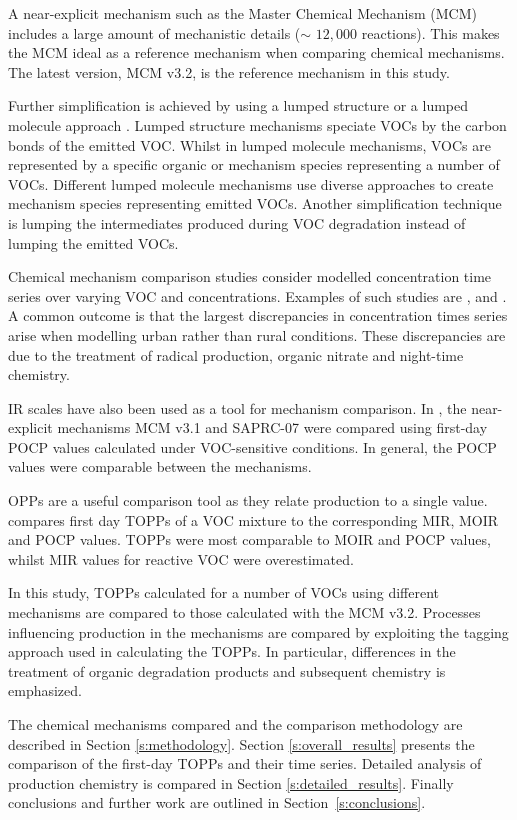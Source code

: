 A near-explicit mechanism such as the Master Chemical Mechanism (MCM) \citep{Jenkin:2003, Saunders:2003, Bloss:2005} includes a large amount of mechanistic details ($\sim$ $12,000$ reactions). 
This makes the MCM ideal as a reference mechanism when comparing chemical mechanisms. 
The latest version, MCM v3.2, \citep{MCM_Site} is the reference mechanism in this study.

Further simplification is achieved by using a lumped structure or a lumped molecule approach \citep{Dodge:2000}. 
Lumped structure mechanisms speciate VOCs by the carbon bonds of the emitted VOC. 
Whilst in lumped molecule mechanisms, VOCs are represented by a specific organic or mechanism species representing a number of VOCs. 
Different lumped molecule mechanisms use diverse approaches to create mechanism species representing emitted VOCs.  
Another simplification technique is lumping the intermediates produced during VOC degradation instead of lumping the emitted VOCs.

Chemical mechanism comparison studies consider modelled  concentration time series over varying VOC and  concentrations. 
Examples of such studies are \citet{Dunker:1984}, \citet{Kuhn:1998} and \citet{Emmerson:2009}.
A common outcome is that the largest discrepancies in  concentration times series arise when modelling urban rather than rural conditions.
These discrepancies are due to the treatment of radical production, organic nitrate and night-time chemistry.

IR scales have also been used as a tool for mechanism comparison. 
In \citet{Derwent:2010}, the near-explicit mechanisms MCM v3.1 and SAPRC-07 were compared using first-day POCP values calculated under VOC-sensitive conditions. 
In general, the POCP values were comparable between the mechanisms. 

OPPs are a useful comparison tool as they relate  production to a single value. 
\citet{Butler:2011} compares first day TOPPs of a VOC mixture to the corresponding MIR, MOIR and POCP values.
TOPPs were most comparable to MOIR and POCP values, whilst MIR values for reactive VOC were overestimated.

In this study, TOPPs calculated for a number of VOCs using different mechanisms are compared to those calculated with the MCM v3.2. 
Processes influencing  production in the mechanisms are compared by exploiting the tagging approach used in calculating the TOPPs.
In particular, differences in the treatment of organic degradation products and subsequent chemistry is emphasized.

The chemical mechanisms compared and the comparison methodology are described in Section \ref{s:methodology}. 
Section \ref{s:overall_results} presents the comparison of the first-day TOPPs and their time series. 
Detailed analysis of  production chemistry is compared in Section \ref{s:detailed_results}. 
Finally conclusions and further work are outlined in \mbox{Section \ref{s:conclusions}}.  
